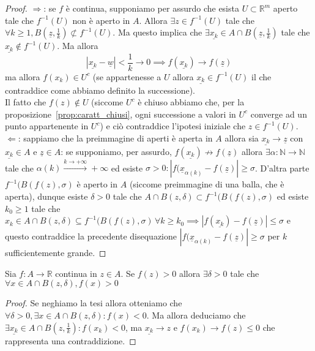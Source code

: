 \begin{proof} \hspace{1em} \newline
$\boxed{\Rightarrow}$: se $f$ è continua, supponiamo per assurdo che esista $U \subset \mathbb{R}^m$ aperto tale che $f^{-1}(U)$ non è aperto in $A$. Allora $\exists z \in f^{-1}(U)$ tale che $\forall k \geq 1, B(\underline{z}, \frac{1}{k}) \not\subset f^{-1}(U)$. Ma questo implica che $\exists \underline{x_k} \in A \cap B(\underline{z}, \frac{1}{k})$ tale che $\underline{x_k} \not\in f^{-1}(U)$. Ma allora 
$$
|\underline{x_k} - \underline{w}| < \frac{1}{k} \to 0 \implies f(\underline{x_k}) \to f(\underline{z})
$$
ma allora $f(x_k) \in U^c$ (se appartenesse a $U$ allora $\underline{x_k} \in f^{-1}(U)$ il che contraddice come abbiamo definito la successione). \\ Il fatto che $f(z) \not\in U$ (siccome $U^c$ è chiuso abbiamo che, per la proposizione~\ref{prop:caratt_chiusi}, ogni successione a valori in $U^c$ converge ad un punto appartenente in $U^c$) e ciò contraddice l'ipotesi iniziale che $z \in f^{-1}(U)$. \\
$\boxed{\Leftarrow}$: sappiamo che la preimmagine di aperti è aperta in $A$ allora sia $\underline{x_k} \to \underline{z}$ con $\underline{x_k} \in A$ e $\underline{z} \in A$: se supponiamo, per assurdo, $f(\underline{x_k}) \not\to f(\underline{z})$ allora $\exists \alpha: \mathbb{N} \to \mathbb{N}$ tale che $\alpha(k) \stackrel{k \to +\infty}{\to} +\infty$ ed esiste $\sigma > 0: |f(\underline{x}_{\alpha(k)} - f(\underline{z})| \geq \sigma$. D'altra parte $f^{-1}(B(f(z), \sigma)$ è aperto in $A$ (siccome preimmagine di una balla, che è aperta), dunque esiste $\delta > 0$ tale che $A \cap B(z, \delta) \subset f^{-1}(B(f(z), \sigma)$ ed esiste $k_0 \geq 1$ tale che $x_k \in A \cap B(z, \delta) \subseteq f^{-1}(B(f(z), \sigma) \, \forall k \geq k_0 \implies |f(\underline{x_k}) - f(\underline{z})| \leq \sigma$ e questo contraddice la precedente disequazione $|f(\underline{x}_{\alpha(k)}-f(\underline{z})| \geq \sigma$ per $k$ sufficientemente grande.
\end{proof}
\begin{theorem}
Sia $f: A \to \mathbb{R}$ continua in $z \in A$. Se $f(z) > 0$ allora $\exists \delta > 0$ tale che $\forall x \in A \cap B(z, \delta), f(x) > 0$
\end{theorem}
\begin{proof}
Se neghiamo la tesi allora otteniamo che $\forall \delta > 0, \exists x \in A \cap B(z, \delta): f(x) < 0$. Ma allora deduciamo che $\exists \underline{x_k} \in A \cap B(z, \frac{1}{k}): f(x_k) <0$, ma $\underline{x_k} \to z$ e $f(x_k) \to f(z) \leq 0$ che rappresenta una contraddizione.
\end{proof}
